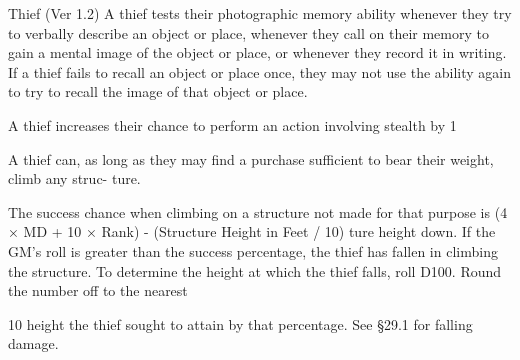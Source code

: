 \begin{Chapter}{Thief (Ver 1.2)}
A  thief  tests  their  photographic  memory  ability 
whenever they try to verbally describe an object or 
place, whenever they call on their memory to gain 
a mental image of the object or place, or whenever 
they record it in writing. If a thief fails to recall an 
object  or  place  once,  they  may  not  use  the  ability 
again  to  try  to  recall  the  image  of  that  object  or 
place. 

A  thief  increases  their  chance  to  perform  an 
action involving stealth by 1%

A thief can, as long as they may find a purchase 
sufficient  to  bear  their weight,  climb  any  struc-
ture. 

The  success  chance  when  climbing  on  a  structure 
not made for that purpose is (4 × MD + 10 × Rank) 
- (Structure Height in Feet / 10)%
ture  height  down.  If  the  GM’s  roll  is  greater  than 
the  success  percentage,  the  thief  has  fallen  in 
climbing  the  structure.  To  determine  the  height  at 
which the thief falls, roll D100. Round the number 
off to the nearest 

10%
height the thief sought to attain by that percentage. 
See §29.1 for falling damage. 

\end{Chapter}
